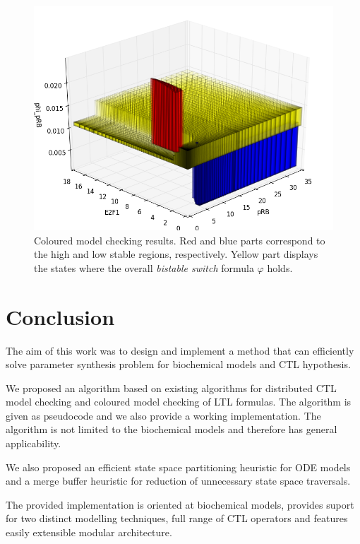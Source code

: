 \documentclass[12pt,oneside, draft]{fithesis2}
\begin{document}
\begin{figure}
\begin{center}
\includegraphics[scale=.35]{3d.png}
\end{center}
\vspace*{-0.5em}
\caption{Coloured model checking results. Red and blue parts
  correspond to the high and low stable regions, respectively. Yellow part
  displays the states where the overall \emph{bistable switch} formula $\varphi$
  holds.}
\label{fig:3dresults}
\end{figure}

	\chapter{Conclusion}
		
		The aim of this work was to design and implement a method that can efficiently solve parameter synthesis problem for biochemical models and CTL hypothesis. 
		
		We proposed an algorithm based on existing algorithms for distributed CTL model checking and coloured model checking of LTL formulas. The algorithm is given as pseudocode and we also provide a working implementation. The algorithm is not limited to the biochemical models and therefore has general applicability.

		We also proposed an efficient state space partitioning heuristic for ODE models and a merge buffer heuristic for reduction of unnecessary state space traversals.
				
		The provided implementation is oriented at biochemical models, provides suport for two distinct modelling techniques, full range of CTL operators and features easily extensible modular architecture.
		
\end{document}
